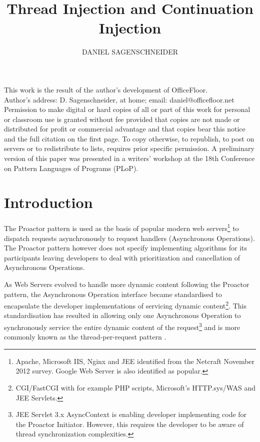 \documentclass[prodmode]{style/acmlarge}
\title{Thread Injection and Continuation Injection}
\author{DANIEL SAGENSCHNEIDER \affil{daniel@officefloor.net}}
\begin{document}
\begin{bottomstuff}
This work is the result of the author's development of OfficeFloor.\\
Author's address: D. Sagenschneider, at home; email: daniel@officefloor.net\\

Permission to make digital or hard copies of all or part of this work for
personal or classroom use is granted without fee provided that copies are not
made or distributed for profit or commercial advantage and that copies bear this
notice and the full citation on the first page. To copy otherwise, to republish,
to post on servers or to redistribute to lists, requires prior specific
permission. A preliminary version of this paper was presented in a writers'
workshop at the 18th Conference on Pattern Languages of Programs (PLoP).
\end{bottomstuff}

\maketitle


\section{Introduction}

The Proactor pattern \cite{proactor} is used as the basis of popular modern web
servers\footnote{Apache, Microsoft IIS, Nginx and JEE identified from the
Netcraft November 2012 survey.  Google Web Server is also identified as
popular.} to dispatch requests asynchronously to request handlers (Asynchronous
Operations).  The Proactor pattern however does not specify implementing
algorithms for its participants leaving developers to deal with prioritization
and cancellation of Asynchronous Operations.

As Web Servers evolved to handle more dynamic content following the Proactor
pattern, the Asynchronous Operation interface became standardised to encapsulate
the developer implementations of servicing dynamic content\footnote{CGI/FastCGI
with for example PHP scripts, Microsoft's HTTP.sys/WAS and JEE Servlets.}.  This
standardisation has resulted in allowing only one Asynchronous Operation to
synchronously service the entire dynamic content of the request\footnote{JEE
Servlet 3.x AsyncContext is enabling developer implementing code for the
Proactor Initiator.  However, this requires the developer to be aware of thread
synchronization complexities.} and is more commonly known as the
thread-per-request pattern \cite{thread-per-request}.
\end{document}
